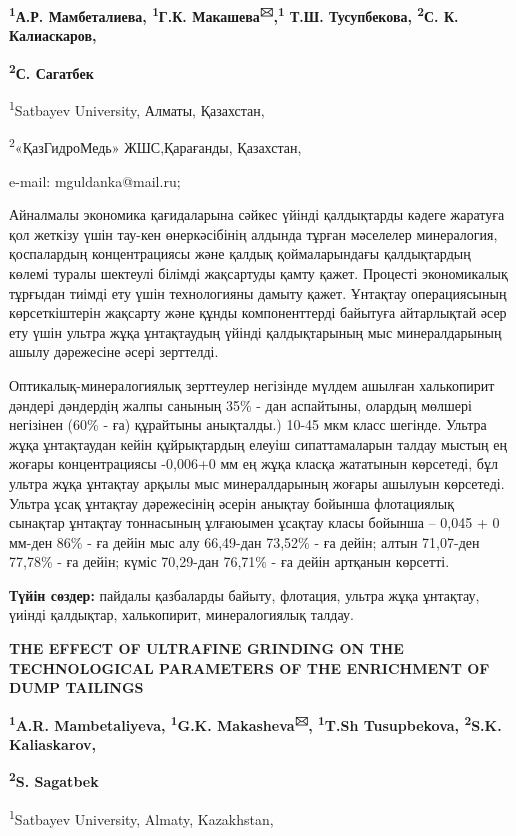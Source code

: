{\bfseries \textsuperscript{1}А.Р. Мамбеталиева, \textsuperscript{1}Г.К.
Макашева\textsuperscript{🖂},\textsuperscript{1} Т.Ш. Тусупбекова,
\textsuperscript{2}С. К. Калиаскаров,}

{\bfseries \textsuperscript{2}С. Сагатбек}

\textsuperscript{1}Satbayev University, Алматы, Қазахстан,

\textsuperscript{2}«ҚазГидроМедь» ЖШС,Қарағанды, Қазахстан,

e-mail: mguldanka@mail.ru;

Айналмалы экономика қағидаларына сәйкес үйінді қалдықтарды кәдеге
жаратуға қол жеткізу үшін тау-кен өнеркәсібінің алдында тұрған мәселелер
минералогия, қоспалардың концентрациясы және қалдық қоймаларындағы
қалдықтардың көлемі туралы шектеулі білімді жақсартуды қамту қажет.
Процесті экономикалық тұрғыдан тиімді ету үшін технологияны дамыту
қажет. Ұнтақтау операциясының көрсеткіштерін жақсарту және құнды
компоненттерді байытуға айтарлықтай әсер ету үшін ультра жұқа
ұнтақтаудың үйінді қалдықтарының мыс минералдарының ашылу дәрежесіне
әсері зерттелді.

Оптикалық-минералогиялық зерттеулер негізінде мүлдем ашылған халькопирит
дәндері дәндердің жалпы санының 35\% - дан аспайтыны, олардың мөлшері
негізінен (60\% - ға) құрайтыны анықталды.) 10-45 мкм класс шегінде.
Ультра жұқа ұнтақтаудан кейін құйрықтардың елеуіш сипаттамаларын талдау
мыстың ең жоғары концентрациясы -0,006+0 мм ең жұқа класқа жататынын
көрсетеді, бұл ультра жұқа ұнтақтау арқылы мыс минералдарының жоғары
ашылуын көрсетеді. Ультра ұсақ ұнтақтау дәрежесінің әсерін анықтау
бойынша флотациялық сынақтар ұнтақтау тоннасының ұлғаюымен ұсақтау класы
бойынша -- 0,045 + 0 мм-ден 86\% - ға дейін мыс алу 66,49-дан 73,52\% -
ға дейін; алтын 71,07-ден 77,78\% - ға дейін; күміс 70,29-дан 76,71\% -
ға дейін артқанын көрсетті.

{\bfseries Түйін сөздер:} пайдалы қазбаларды байыту, флотация, ультра жұқа
ұнтақтау, үиінді қалдықтар, халькопирит, минералогиялық талдау.

{\bfseries THE EFFECT OF ULTRAFINE GRINDING ON THE TECHNOLOGICAL PARAMETERS
OF THE ENRICHMENT OF DUMP TAILINGS}

{\bfseries \textsuperscript{1}A.R. Mambetaliyeva, \textsuperscript{1}G.K.
Makasheva\textsuperscript{🖂}, \textsuperscript{1}T.Sh Tusupbekova,
\textsuperscript{2}S.K. Kaliaskarov,}

{\bfseries \textsuperscript{2}S. Sagatbek}

\textsuperscript{1}Satbayev University, Almaty, Kazakhstan,

